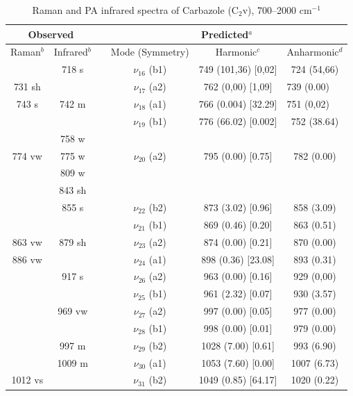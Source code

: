 	\begin{table}[H]
		\caption{Raman and PA infrared spectra of Carbazole (C$_{2}$v), 700–2000 cm$^{-1}$}
		\begin{center}
			\begin{threeparttable}
				\begin{tabular}{c c c c c c}
					\hline
					\multicolumn{ 2}{c}{Observed} & \multicolumn{1}{c}{} & \multicolumn{ 3}{c}{Predicted$^{a}$} \\ \hline
					Raman$^{b}$ & \multicolumn{1}{c}{Infrared$^{b}$} &  & \multicolumn{1}{c}{Mode (Symmetry)} & \multicolumn{1}{c}{Harmonic$^{c}$} & Anharmonic$^{d}$ \\ \hline
	& 718 s &  & $\nu_{16}$ (b1) & 749 (101,36) [0,02] & 724 (54,66) \\ 
	731 sh &  &  & $\nu_{17}$ (a2) & 762 (0,00) [1,09] & \multicolumn{1}{l}{      739 (0.00)} \\
	743 s & 742 m &  & $\nu_{18}$ (a1) & 766 (0.004) [32.29] & \multicolumn{1}{l}{      751 (0,02)} \\ 
	&  &  & $\nu_{19}$ (b1) & 776 (66.02) [0.002] & 752 (38.64) \\ 
	& 758 w &  &  &  &  \\ 
	774 vw & 775 w &  &$\nu_{20}$ (a2) & 795 (0.00) [0.75] & 782 (0.00) \\ 
	& 809 w &  &  &  &  \\ 
	& 843 sh &  &  &  &  \\ 
	& 855 s &  & $\nu_{22}$ (b2) & 873 (3.02) [0.96] & 858 (3.09) \\ 
	&  &  & $\nu_{21}$ (b1) & 869 (0.46) [0.20] & 863 (0.51) \\
	863 vw & 879 sh &  &$\nu_{23}$ (a2) & 874 (0.00) [0.21] & 870 (0.00) \\
	886 vw &  &  & $\nu_{24}$ (a1) & 898 (0.36) [23.08] & 893 (0.31) \\ 
	 & 917 s &  & $\nu_{26}$ (a2) & 963 (0.00) [0.16] & 929 (0,00) \\
	 &  &  & $\nu_{25}$ (b1) & 961 (2.32) [0.07] & 930 (3.57) \\
	 & 969 vw &  & $\nu_{27}$ (a2) & 997 (0.00) [0.05] & 977 (0.00) \\ 
	 &  &  & $\nu_{28}$ (b1) & 998 (0.00) [0.01] & 979 (0.00) \\ 
	 & 997 m
	 &  & $\nu_{29}$ (b2)
	 & 1028 (7.00) [0.61] & 993 (6.90) \\ 
	 & 1009 m	 &  & $\nu_{30}$ (a1)  & 1053 (7.60) [0.00] & 1007 (6.73)	 \\ 
	 1012 vs &  &  & $\nu_{31}$ (b2) & 1049 (0.85) [64.17] & 1020 (0.22) \\ 

\end{tabular}
\end{threeparttable}
\end{center}
\end{table}
